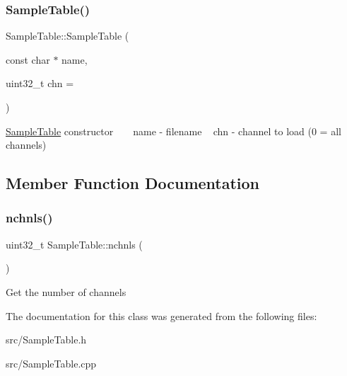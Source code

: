 \subsubsection{\texorpdfstring{Sample\+Table()}{SampleTable()}}
{\footnotesize\ttfamily Sample\+Table\+::\+Sample\+Table (\begin{DoxyParamCaption}\item[{const char $\ast$}]{name,  }\item[{uint32\+\_\+t}]{chn = {} }\end{DoxyParamCaption})}

\hyperlink{class_sample_table}{Sample\+Table} constructor ~\newline
~\newline
name -\/ filename ~\newline
chn -\/ channel to load (0 = all channels) ~\newline


\subsection{Member Function Documentation}
\mbox{\label{class_sample_table_abab11cfefc24be1ad15a5fdbf9cd29dc}} 
\subsubsection{\texorpdfstring{nchnls()}{nchnls()}}
{\footnotesize\ttfamily uint32\+\_\+t Sample\+Table\+::nchnls (\begin{DoxyParamCaption}{ }\end{DoxyParamCaption})\hspace{0.3cm}{\ttfamily [inline]}}

Get the number of channels 

The documentation for this class was generated from the following files\+:\begin{DoxyCompactItemize}
\item 
src/Sample\+Table.\+h\item 
src/Sample\+Table.\+cpp\end{DoxyCompactItemize}
